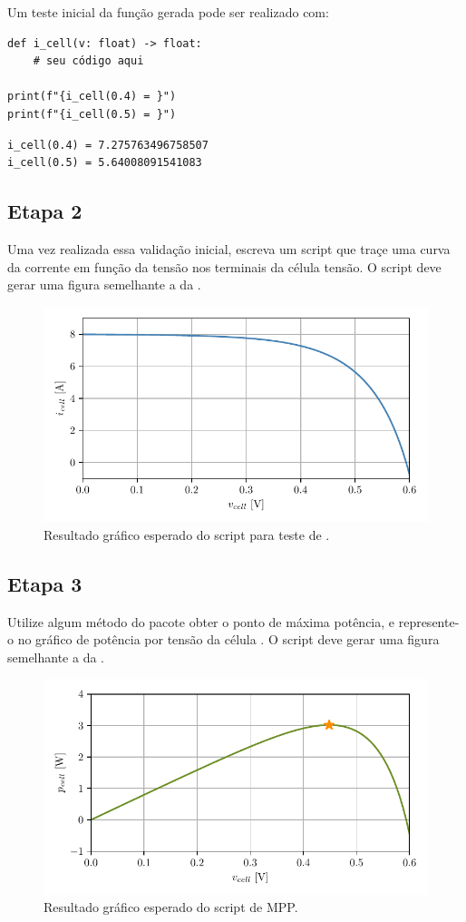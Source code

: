 Um teste inicial da função gerada pode ser realizado com:
\begin{verbatim}
def i_cell(v: float) -> float:
    # seu código aqui

print(f"{i_cell(0.4) = }")
print(f"{i_cell(0.5) = }")
\end{verbatim}
\begin{verbatim}
i_cell(0.4) = 7.275763496758507
i_cell(0.5) = 5.64008091541083
\end{verbatim}

\subsection*{Etapa 2}
Uma vez realizada essa validação inicial, escreva um script que traçe uma curva da corrente em
função da tensão nos terminais da célula tensão.
O script deve gerar uma figura semelhante a da .
\begin{figure}[htbp]
    \centering
    \includegraphics[scale=1.0]{figs/pvcell}
    \caption{Resultado gráfico esperado do script para teste de .}
    \label{fig:pv}
\end{figure}


\subsection*{Etapa 3}
Utilize algum método do pacote  obter o ponto de máxima potência, e represente-o no gráfico
de potência por tensão da célula    .
O script deve gerar uma figura semelhante a da .
\begin{figure}[htbp]
    \centering
    \includegraphics[scale=1.0]{figs/pvcellotp}
    \caption{Resultado gráfico esperado do script de MPP.}
    \label{fig:pvotp}
\end{figure}